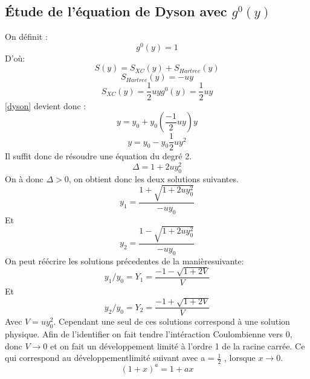 \documentclass[12pt]{article}
\begin{document}
\subsection{\'Etude de l'\'equation de Dyson avec $g^0(y)$}
On d\'efinit :
\begin{equation}
 g^0(y) = 1
\end{equation}
D'o\`u:
\begin{equation}
 S(y) = S_{XC}(y) + S_{Hartree}(y)
\end{equation}
\begin{equation}
 S_{Hartree}(y) = -uy
\end{equation}
\begin{equation}
 S_{XC}(y) = \frac{1}{2} u y g^0(y) = \frac{1}{2} u y
\end{equation}
\ref{dyson} devient donc :
\begin{equation}
 y = y_0 + y_0 (\frac{-1}{2} u y) y
\end{equation}
\begin{equation}
 y = y_0 - y_0 \frac{1}{2} u y^2
\end{equation}
Il suffit donc de r\'esoudre une \'equation du degr\'e 2.
\begin{equation}
 \Delta = 1 + 2 u y_0^2
\end{equation}
On \`a donc $\Delta > 0 $, on obtient donc les deux solutions suivantes.
\begin{equation}
 y_1 = \frac{1 + \sqrt{1 + 2 u y_0 ^2}}{- u y_0}
\end{equation}
Et 
\begin{equation}
 y_2 = \frac{1 - \sqrt{1 + 2 u y_0^2}}{- u y_0}
\end{equation}
On peut r\'e\'ecrire les solutions pr\'ecedentes de la mani\`eresuivante:
\begin{equation}
 y_1/y_0 = Y_1 = \frac{-1-\sqrt{1 + 2 V}}{V}
\end{equation}
Et 
\begin{equation}
 y_2/y_0 = Y_2 = \frac{-1 + \sqrt{1 + 2V}}{V}
\end{equation}
Avec $V = uy_0^2$. Cependant une seul de ces solutions correspond \`a une solution physique. 
Afin de l'identifier on fait tendre l'int\'eraction Coulombienne vers 0, donc $V\rightarrow 0$ et on fait un d\'eveloppement limit\'e \`a l'ordre 1 de la racine carr\'ee. Ce qui correspond au d\'eveloppementlimit\'e suivant avec a = $\frac{1}{2}$
, lorsque $x \rightarrow 0 $.
\begin{equation}
 (1 + x)^a = 1 + ax 
\end{equation}
\end{document}
